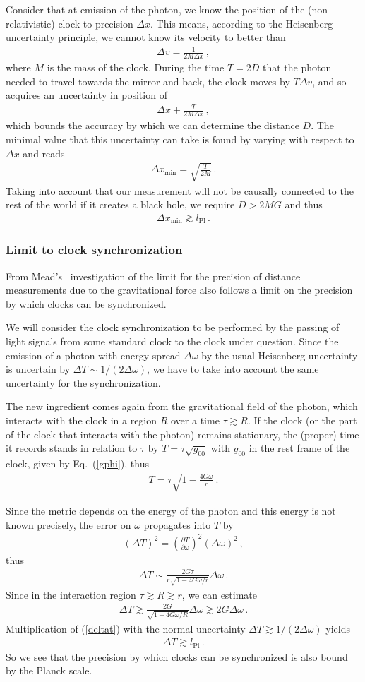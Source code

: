 \documentclass{article}
\def\beqn{\begin{eqnarray}}
\def\eeqn{\end{eqnarray}}
\begin{document}
Consider that at emission of the photon, we know the position of
the (non-relativistic) clock to precision $\Delta x$. This means, according to the Heisenberg uncertainty principle, 
we cannot know its velocity to better than
\beqn
\Delta v = \frac{1}{2 M \Delta x} \,,
\eeqn
where $M$ is the mass of the clock. During the time $T=2D$ that the photon needed to travel towards the mirror and 
back, the clock moves by $T\Delta v$, and
so acquires an
uncertainty in position of
\beqn
\Delta x + \frac{T}{2 M \Delta x} \,,
\eeqn
which bounds the accuracy by which we can determine the distance $D$. The minimal value that this uncertainty can
take is found by varying with respect to $\Delta x$ and reads
\beqn
\Delta x_{\min} = \sqrt{\frac{T}{2 M}} \,.
\eeqn
Taking into account that our measurement will not be causally connected to the rest of the world if it creates
a black hole, we require $D > 2 M G$ and thus
\beqn
\Delta x_{\min} \gtrsim l_{\mathrm{Pl}} \,.
\eeqn


\subsubsection{Limit to clock synchronization}


From Mead's~\cite{Mead} investigation of the limit for the precision 
of distance measurements due to the gravitational force also follows a limit on the precision by which clocks can be
synchronized. 

We will consider the clock synchronization to be performed by the passing
of light signals from some standard clock to the clock under question.  Since the emission
of a photon with energy spread $\Delta \omega$ by the usual Heisenberg uncertainty 
is uncertain by $\Delta T \sim 1/(2 \Delta \omega)$, we have to take into account the same uncertainty 
for the  synchronization.

The new ingredient comes again from the gravitational field of the photon, which interacts
with the clock in a region $R$ over a time $\tau \gtrsim R$. If the clock (or the part of the
clock that interacts with the photon) remains stationary, the (proper) time it records stands 
in relation to $\tau$ by $T = \tau \sqrt{g_{00}}$
with $g_{00}$ in the rest frame of the clock, given by Eq.~(\ref{gphi}), thus
\beqn
T = \tau \sqrt{1-\frac{4G\omega}{r}} \,.
\eeqn

Since the metric depends on the energy of the photon and this energy is not known precisely, the error on $\omega$ 
propagates into $T$ by 
\beqn
(\Delta T)^2 = \left(\frac{\partial T}{\partial \omega} \right)^2 (\Delta \omega)^2 \,,
\eeqn
thus
\beqn
\Delta T \sim  \frac{2 G \tau}{r \sqrt{1 - 4 G \omega/r}} \Delta \omega \,.
\eeqn
Since in the interaction region $\tau \gtrsim R \gtrsim r$, we can estimate
\beqn
\Delta T \gtrsim \frac{2 G}{\sqrt{1 - 4 G \omega/R}} \Delta \omega  \gtrsim 2 G \Delta \omega \,. \label{deltat}
\eeqn
Multiplication of (\ref{deltat}) with the normal uncertainty $\Delta T \gtrsim 1/(2 \Delta \omega)$ yields
\beqn
\Delta T \gtrsim l_{\mathrm{Pl}} \,. \label{deltatmead}
\eeqn
So we see that the precision by which clocks can be synchronized is also bound by the Planck scale.
\end{document}
